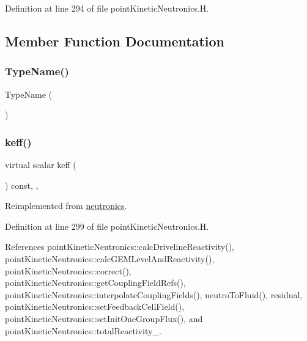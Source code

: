 Definition at line 294 of file point\+Kinetic\+Neutronics.\+H.



\subsection{Member Function Documentation}
\mbox{\label{classFoam_1_1pointKineticNeutronics_abe23deccc930f2fa1429fad7958c8a10}} 
\subsubsection{\texorpdfstring{Type\+Name()}{TypeName()}}
{\footnotesize\ttfamily Type\+Name (\begin{DoxyParamCaption}\item[{\char`\"{}point\+Kinetics\char`\"{}}]{ }\end{DoxyParamCaption})}

\mbox{\label{classFoam_1_1pointKineticNeutronics_ae9f7e220f9ccd96de428a0eb4a8f9da0}} 
\subsubsection{\texorpdfstring{keff()}{keff()}}
{\footnotesize\ttfamily virtual scalar keff (\begin{DoxyParamCaption}{ }\end{DoxyParamCaption}) const\hspace{0.3cm}{\ttfamily [inline]}, {\ttfamily [override]}, {\ttfamily [virtual]}}



Reimplemented from \hyperlink{classFoam_1_1neutronics_ab862f8cf7194ac338be0d8130602db65}{neutronics}.



Definition at line 299 of file point\+Kinetic\+Neutronics.\+H.



References point\+Kinetic\+Neutronics\+::calc\+Driveline\+Reactivity(), point\+Kinetic\+Neutronics\+::calc\+G\+E\+M\+Level\+And\+Reactivity(), point\+Kinetic\+Neutronics\+::correct(), point\+Kinetic\+Neutronics\+::get\+Coupling\+Field\+Refs(), point\+Kinetic\+Neutronics\+::interpolate\+Coupling\+Fields(), neutro\+To\+Fluid(), residual, point\+Kinetic\+Neutronics\+::set\+Feedback\+Cell\+Field(), point\+Kinetic\+Neutronics\+::set\+Init\+One\+Group\+Flux(), and point\+Kinetic\+Neutronics\+::total\+Reactivity\+\_\+.

